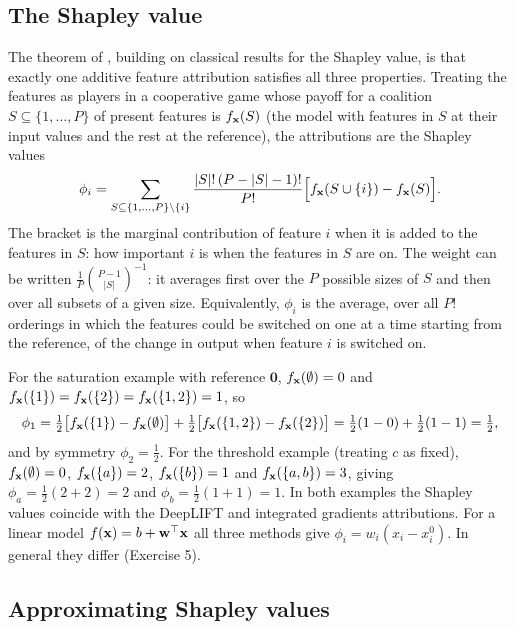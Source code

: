 \subsection{The Shapley value}

The theorem of \citet{lundberg2017}, building on classical results for the Shapley value, is that exactly one additive feature attribution satisfies all three properties. Treating the features as players in a cooperative game whose payoff for a coalition $S\subseteq\{1,\dots,P\}$ of present features is $f_{\mathbf{x}}(S)$ (the model with features in $S$ at their input values and the rest at the reference), the attributions are the Shapley values
\begin{equation}
  \phi_i = \sum_{S\subseteq\{1,\dots,P\}\setminus\{i\}} \frac{|S|!\,(P-|S|-1)!}{P!}\Big[f_{\mathbf{x}}(S\cup\{i\})-f_{\mathbf{x}}(S)\Big].
  \label{eq:shapley}
\end{equation}
The bracket is the marginal contribution of feature $i$ when it is added to the features in $S$: how important $i$ is when the features in $S$ are on. The weight can be written $\frac{1}{P}\binom{P-1}{|S|}^{-1}$: it averages first over the $P$ possible sizes of $S$ and then over all subsets of a given size. Equivalently, $\phi_i$ is the average, over all $P!$ orderings in which the features could be switched on one at a time starting from the reference, of the change in output when feature $i$ is switched on.

For the saturation example with reference $\mathbf{0}$, $f_{\mathbf{x}}(\emptyset)=0$ and $f_{\mathbf{x}}(\{1\})=f_{\mathbf{x}}(\{2\})=f_{\mathbf{x}}(\{1,2\})=1$, so
\begin{equation}
  \phi_1 = \tfrac12\big[f_{\mathbf{x}}(\{1\})-f_{\mathbf{x}}(\emptyset)\big]+\tfrac12\big[f_{\mathbf{x}}(\{1,2\})-f_{\mathbf{x}}(\{2\})\big] = \tfrac12(1-0)+\tfrac12(1-1) = \tfrac12,
\end{equation}
and by symmetry $\phi_2=\frac12$. For the threshold example (treating $c$ as fixed), $f_{\mathbf{x}}(\emptyset)=0$, $f_{\mathbf{x}}(\{a\})=2$, $f_{\mathbf{x}}(\{b\})=1$ and $f_{\mathbf{x}}(\{a,b\})=3$, giving $\phi_a=\frac12(2+2)=2$ and $\phi_b=\frac12(1+1)=1$. In both examples the Shapley values coincide with the DeepLIFT and integrated gradients attributions. For a linear model $f(\mathbf{x})=b+\mathbf{w}^\top\mathbf{x}$ all three methods give $\phi_i=w_i(x_i-x_i^0)$. In general they differ (Exercise 5).

\subsection{Approximating Shapley values}

